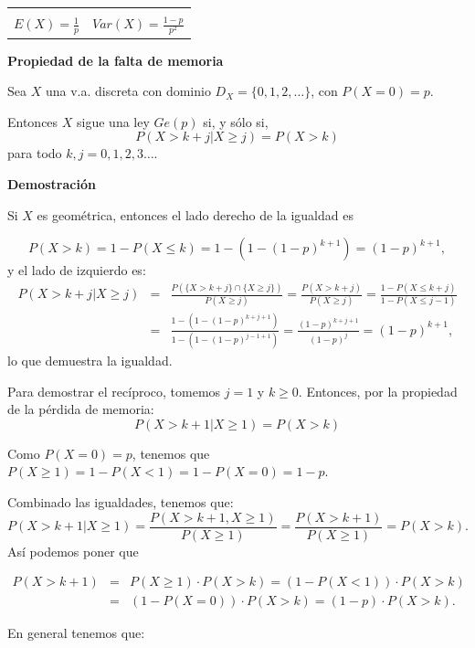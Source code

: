 \documentclass[]{book}
\begin{document}
\begin{longtable}[]{@{}rl@{}}
\begin{minipage}[t]{0.43\columnwidth}
\end{minipage}\tabularnewline
\begin{minipage}[t]{0.51\columnwidth}\raggedleft
\(E(X)=\frac1{p}\)\strut
\end{minipage} & \begin{minipage}[t]{0.43\columnwidth}\raggedright
\(Var(X)=\frac{1-p}{p^2}\)\strut
\end{minipage}\tabularnewline
\bottomrule
\end{longtable}

\textbf{Propiedad de la falta de memoria}

Sea \(X\) una v.a. discreta con dominio \(D_X=\{0,1,2,\ldots\}\), con \(P(X=0)=p\).

Entonces \(X\) sigue una ley \(Ge(p)\) si, y sólo si,
\[
P\left(X> k+j\big| X\geq j\right)=P(X> k)
\]
para todo \(k,j=0,1,2,3\ldots\).

\textbf{Demostración}

Si \(X\) es geométrica, entonces el lado derecho de la igualdad es

\[
P(X>k)=1-P(X\leq k)=1-\left(1-(1-p)^{k+1}\right)=(1-p)^{k+1},
\]
y el lado de izquierdo es:
\begin{eqnarray*} 
P\left(X> k+j\big| X\geq j\right)&=&\frac{P\left(\{X> k+j\}\cap \{X\geq j\} \right)}{P\left(X\geq j\right)}=
\frac{P\left(X>k+j \right)}{P\left(X\geq j \right)} = \frac{1-P(X\leq k+j)}{1-P(X\leq j-1)}\\
&=&  \frac{1-(1-(1-p)^{k+j+1})}{1-(1-(1-p)^{j-1+1})} =\frac{(1-p)^{k+j+1}}{(1-p)^{j}} = (1-p)^{k+1},
\end{eqnarray*}
lo que demuestra la igualdad.

Para demostrar el recíproco, tomemos \(j=1\) y \(k\geq 0\). Entonces, por la propiedad de la pérdida de memoria:
\[
P\left(X> k+1\big| X\geq 1\right)=P(X> k)
\]

Como \(P(X=0)=p\), tenemos que \(P(X \geq 1 )=1-P(X<1)=1-P(X=0)=1-p\).

Combinado las igualdades, tenemos que:
\[
P\left(X> k+1\big| X\geq 1\right)=\frac{P(X>k+1, X\geq 1)}{P(X\geq 1)}=\frac{P(X>k+1)}{P(X\geq 1)}=P(X>k).
\]
Así podemos poner que

\begin{eqnarray*}
P(X>k+1)&=&P(X\geq 1)\cdot P(X>k)=\left(1-P(X<1)\right)\cdot P(X>k)\\
&=&\left(1-P(X=0)\right)\cdot P(X>k)=(1-p)\cdot P(X>k).
\end{eqnarray*}

En general tenemos que:
\end{document}
